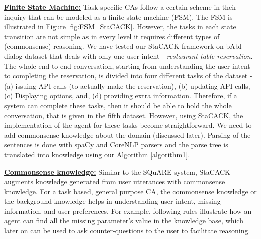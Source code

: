 \documentclass[letterpaper]{article}
\begin{document}
\noindent\textbf{\underline{Finite State Machine:}}
Task-specific CAs follow a certain scheme in their inquiry that can be modeled as a finite state machine (FSM).
The FSM is illustrated in Figure \ref{fig:FSM_StaCACK}. However, the tasks in each state transition are not simple as in every level it requires different types of (commonsense) reasoning. We have tested our StaCACK framework on bAbI dialog dataset that deals with only one user intent - \textit{restaurant table reservation}. The whole end-to-end conversation, starting from understanding the user-intent to completing the reservation, is divided into four different tasks of the dataset - (a) issuing API calls (to actually make the reservation), (b) updating API calls, (c) Displaying options, and, (d) providing extra information. Therefore, if a system can complete these tasks, then it should be able to hold the whole conversation, that is given in the fifth dataset. However, using StaCACK, the implementation of the agent for these tasks become straightforward. We need to add commonsense knowledge about the domain (discussed later). Parsing of the sentences is done with spaCy and CoreNLP parsers and the parse tree is translated into knowledge using our Algorithm \ref{algorithm1}.

\noindent\textbf{\underline{Commonsense knowledge:}}
Similar to the SQuARE system, StaCACK augments knowledge generated from user utterances with commonsense knowledge. For a task based, general purpose CA, the commonsense knowledge or the background knowledge helps in understanding user-intent, missing information, and user preferences. For example, following rules illustrate how an agent can find all the missing parameter's value in the knowledge base, which later on can be used to ask counter-questions to the user to facilitate reasoning.

\noindent
\cprotect {}
\end{document}
